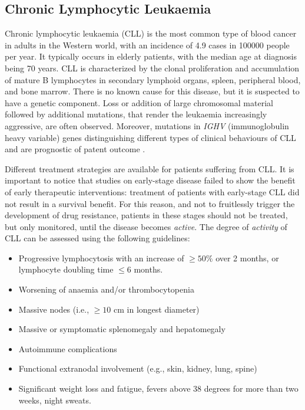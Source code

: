 \subsection{Chronic Lymphocytic Leukaemia}
Chronic lymphocytic leukaemia (CLL) is the most common type of blood cancer in adults in the Western world, with an incidence of 4.9 cases in 100000 people per year. It typically occurs in elderly patients, with the median age at diagnosis being 70 years. CLL is characterized by the clonal proliferation and accumulation of mature B lymphocytes in secondary lymphoid organs, spleen, peripheral blood, and bone marrow. \cite{cll-burger-med, cll-rozman-med}  There is no known cause for this disease, but it is suspected to have a genetic component. Loss or addition of large chromosomal material followed by additional mutations, that render the leukaemia increasingly aggressive, are often observed. Moreover, mutations in \textit{IGHV} (immunoglobulin heavy variable) genes distinguishing different types of clinical behaviours of CLL and are prognostic of patent outcome \cite{immunogl-med}. \par
\vspace{0.4cm}
Different treatment strategies are available for patients suffering from CLL. It is important to notice that studies on early-stage disease failed to show the benefit of early therapeutic interventions: treatment of patients with early-stage CLL did not result in a survival benefit. For this reason, and not to fruitlessly trigger the development of drug resistance, patients in these stages should not be treated, but only monitored, until the disease becomes \textit{active}. The degree of \textit{activity} of CLL can be assessed using the following guidelines:
\begin{itemize}
    \item Progressive lymphocytosis with an increase of $\geq 50 \%$ over 2 months, or lymphocyte doubling time $\leq 6$ months.
    \item Worsening of anaemia and/or thrombocytopenia
    \item Massive nodes (i.e., $\geq 10$ cm in longest diameter)
    \item Massive or symptomatic splenomegaly and hepatomegaly
    \item Autoimmune complications
    \item Functional extranodal involvement (e.g., skin, kidney, lung, spine)
    \item Significant weight loss and fatigue, fevers above 38 degrees for more than two weeks, night sweats. 
\end{itemize}
